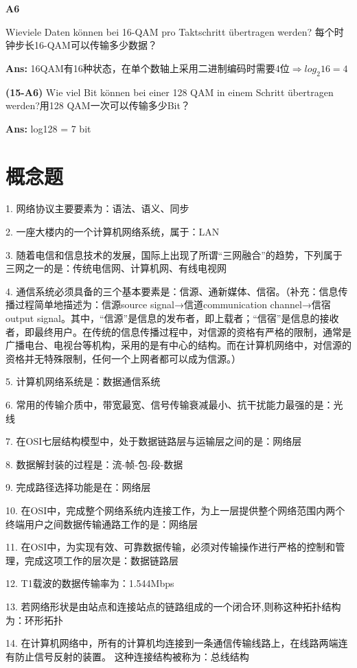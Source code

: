 \documentclass[fleqn]{article}
\begin{document}
\noindent\textbf{A6}

Wieviele Daten können bei 16-QAM pro Taktschritt übertragen werden?
每个时钟步长16-QAM可以传输多少数据？

\textbf{Ans:} 16QAM有16种状态，在单个数轴上采用二进制编码时需要4位$\Rightarrow log_2 16 = 4$

\noindent\textbf{(15-A6)} Wie viel Bit können bei einer 128 QAM in einem Schritt übertragen werden?用128 QAM一次可以传输多少Bit？

\textbf{Ans:}  log128 = 7 bit

\clearpage

\section{概念题}

1. 网络协议主要要素为：语法、语义、同步

2. 一座大楼内的一个计算机网络系统，属于：LAN

3. 随着电信和信息技术的发展，国际上出现了所谓“三网融合”的趋势，下列属于三网之一的是：传统电信网、计算机网、有线电视网

4. 通信系统必须具备的三个基本要素是：信源、通新媒体、信宿。（补充：信息传播过程简单地描述为：信源source signal→信道communication channel→信宿output signal。其中，“信源”是信息的发布者，即上载者；“信宿”是信息的接收者，即最终用户。在传统的信息传播过程中，对信源的资格有严格的限制，通常是广播电台、电视台等机构，采用的是有中心的结构。而在计算机网络中，对信源的资格并无特殊限制，任何一个上网者都可以成为信源。）

5. 计算机网络系统是：数据通信系统

6. 常用的传输介质中，带宽最宽、信号传输衰减最小、抗干扰能力最强的是：光线

7. 在OSI七层结构模型中，处于数据链路层与运输层之间的是：网络层

8. 数据解封装的过程是：流-帧-包-段-数据 

9. 完成路径选择功能是在：网络层

10. 在OSI中，完成整个网络系统内连接工作，为上一层提供整个网络范围内两个终端用户之间数据传输通路工作的是：网络层

11. 在OSI中，为实现有效、可靠数据传输，必须对传输操作进行严格的控制和管理，完成这项工作的层次是：数据链路层

12. T1载波的数据传输率为：1.544Mbps

13. 若网络形状是由站点和连接站点的链路组成的一个闭合环,则称这种拓扑结构为：环形拓扑

14. 在计算机网络中，所有的计算机均连接到一条通信传输线路上，在线路两端连有防止信号反射的装置。 这种连接结构被称为：总线结构
\end{document}
